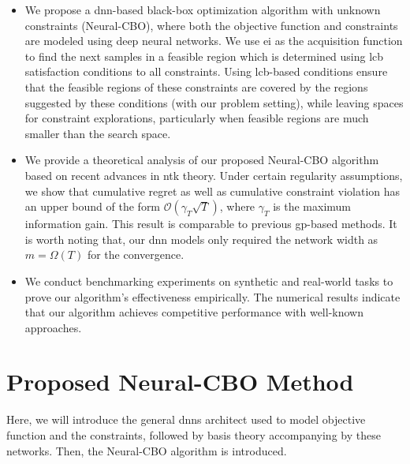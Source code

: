 \begin{itemize}
    \item We propose a \ac{dnn}-based black-box optimization algorithm with unknown constraints (Neural-CBO), where both the objective function and constraints are modeled using deep neural networks. We use \ac{ei} as the acquisition function to find the next samples in a feasible region which is determined using \acf{lcb} satisfaction conditions to all constraints. Using \ac{lcb}-based conditions ensure that the feasible regions of these constraints are covered by the regions suggested by these conditions (with our problem setting), while leaving spaces for constraint explorations, particularly when feasible regions are much smaller than the search space.
 

    \item We provide a theoretical analysis of our proposed Neural-CBO algorithm based on recent advances in \ac{ntk} theory. Under certain regularity assumptions, we show that cumulative regret as well as cumulative constraint violation has an upper bound of the form $\mathcal{O}(\gamma_T\sqrt{T})$, where $\gamma_T$ is the maximum information gain. This result is comparable to previous \ac{gp}-based methods. It is worth noting that, our \ac{dnn} models only required the network width as $m=\Omega(T)$  for the convergence. 
    \item We conduct benchmarking experiments on synthetic and real-world tasks to prove our algorithm's effectiveness empirically. The numerical results indicate that our algorithm achieves competitive performance with well-known approaches.
    \end{itemize}
    
\section{Proposed Neural-CBO Method}
\label{section:neural-cbo}
Here, we will introduce the general \acp{dnn} architect used to model objective function and the constraints, followed by basis theory accompanying by these networks. Then, the Neural-CBO algorithm is introduced. 

